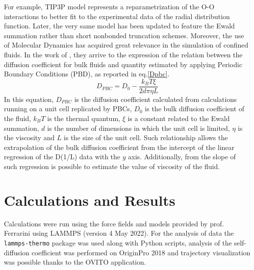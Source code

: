 \documentclass[
	12pt, %
]{fphw}
\begin{document}
For example, TIP3P model represents a reparametrization of the O-O interactions to better fit to the experimental data of the radial distribution function.
Later, the very same model has been updated to feature the Ewald summation rather than short nonbonded truncation schemes.
Moreover, the use of Molecular Dynamics has acquired great relevance in the simulation of confined fluids.
In the work of , they arrive to the expression of the relation between the diffusion coefficient for bulk fluids and quantity estimated by applying Periodic Boundary Conditions (PBD), as reported in eq.\ref{Dpbc}.
\begin{equation}
	D_{PBC} = D_{0} - \frac{k_{B}T\xi}{2d \pi \eta L}
	\label{Dpbc}
\end{equation}
In this equation, $D_{PBC}$ is the diffusion coefficient calculated from calculations running on a unit cell replicated by PBCs, $D_{0}$ is the bulk diffusion coefficient of the fluid, $k_{B}T$ is the thermal quantum, $\xi$ is a constant related to the Ewald summation, $d$ is the number of dimensions in which the unit cell is limited, $\eta$ is the viscosity and $L$ is the size of the unit cell.
Such relationship allows the extrapolation of the bulk diffusion coefficient from the intercept of the linear regression of the D(1/L) data with the $y$ axis.
Additionally, from the slope of such regression is possible to estimate the value of viscosity of the fluid.

\section{Calculations and Results}
Calculations were run using the force fields and models provided by prof. Ferrarini using LAMMPS (version 4 May 2022).
For the analysis of data the \texttt{lammps-thermo} package was used along with Python scripts, analysis of the self-diffusion coefficient was performed on OriginPro 2018 and trajectory visualization was possible thanks to the OVITO application.
\end{document}
